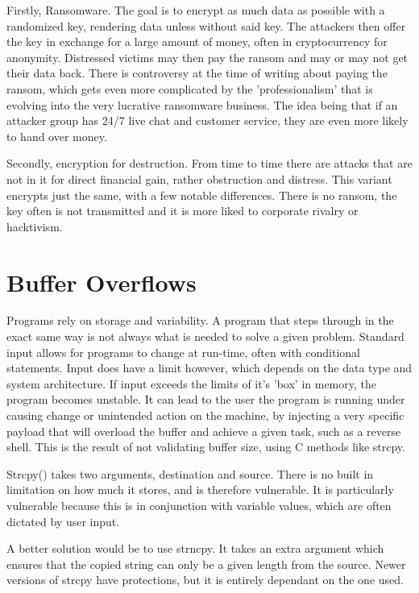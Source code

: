 Firstly, Ransomware. The goal is to encrypt as much data as possible with a randomized key, rendering data unless without said key. The attackers then offer the key in exchange for a large amount of money, often in cryptocurrency for anonymity. Distressed victims may then pay the ransom and may or may not get their data back.
There is controversy at the time of writing about paying the ransom, which gets even more complicated by the 'professionalism' that is evolving into the very lucrative ransomware business. The idea being that if an attacker group has 24/7 live chat and customer service, they are even more likely to hand over money.

Secondly, encryption for destruction. From time to time there are attacks that are not in it for direct financial gain, rather obstruction and distress. This variant encrypts just the same, with a few notable differences. There is no ransom, the key often is not transmitted and it is more liked to corporate rivalry or hacktivism.


\section{Buffer Overflows}
Programs rely on storage and variability. A program that steps through in the exact same way is not always what is needed to solve a given problem. Standard input allows for programs to change at run-time, often with conditional statements. Input does have a limit however, which depends on the data type and system architecture.
If input exceeds the limits of it's 'box' in memory, the program becomes unstable. It can lead to the user the program is running under causing change or unintended action on the machine, by injecting a very specific payload that will overload the buffer and achieve a given task, such as a reverse shell. This is the result of not validating
buffer size, using C methods like strcpy. \citep{strcpy}

Strcpy() takes two arguments, destination and source. There is no built in limitation on how much it stores, and is therefore vulnerable. It is particularly vulnerable because this is in conjunction with variable values, which are often dictated by user input. 

A better solution would be to use strncpy. \citep{strncpy} It takes an extra argument which ensures that the copied string can only be a given length from the source. Newer versions of strcpy have protections, but it is entirely dependant on the one used. \citep{strcpy}

